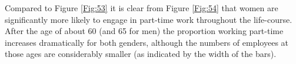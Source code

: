 \documentclass[11 pt, a4paper]{report}
\renewcommand{\arraystretch}{1.2}
\begin{document}
Compared to Figure \ref{Fig:53} it is clear from Figure \ref{Fig:54} that women are significantly more likely to engage in part-time work throughout the life-course. After the age of about 60 (and 65 for men) the proportion working part-time increases dramatically for both genders, although the numbers of employees at those ages are considerably smaller (as indicated by the width of the bars). 

\begin{table}[hpbt!]
\renewcommand{\arraystretch}{1.08}

\centering
\caption{Number (in thousands) and proportion of employees aged between 40 and 70 in full-time or part-time work in the UK, 4th quarter average 2011 (see Figures \ref{Fig:53} and \ref{Fig:54}). Source: \citet{DWP2013}.}
\begin{tabularx}


\end{tabularx}
\end{table}
\end{document}

